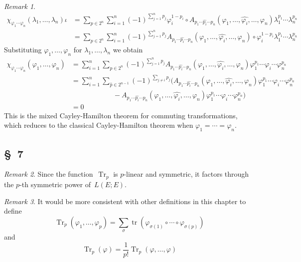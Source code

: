 \documentclass[letterpaper,12pt]{article}
\DeclareMathOperator{\tr}{tr}
\DeclareMathOperator{\Tr}{Tr}
\newcommand{\after}{\circ}
\newcommand{\delete}{\widehat}
\theoremstyle{definition}
\theoremstyle{remark}
\newtheorem*{rmk}{Remark}
\begin{document}
\begin{rmk}
\begin{align*}
\chi_{\varphi_1\cdots\varphi_n}(\lambda_1,\ldots,\lambda_n)\iota&=\sum_{p\in 2^n}\sum_{i=1}^n(-1)^{\sum_{j=1}^n p_j}\varphi_i^{1-p_i}\after A_{p_1\cdots\delete{p_i}\cdots p_n}(\varphi_1,\ldots,\delete{\varphi_i},\ldots,\varphi_n)\lambda_1^{p_1}\cdots\lambda_n^{p_n}\\
	&=\sum_{p\in 2^n}\sum_{i=1}^n(-1)^{\sum_{j=1}^n p_j}A_{p_1\cdots\delete{p_i}\cdots p_n}(\varphi_1,\ldots,\delete{\varphi_i},\ldots,\varphi_n)\after\varphi_i^{1-p_i}\lambda_1^{p_1}\cdots\lambda_n^{p_n}
\end{align*}
Substituting \(\varphi_1,\ldots,\varphi_n\) for \(\lambda_1,\ldots,\lambda_n\) we obtain
\begin{align*}
\chi_{\varphi_1\cdots\varphi_n}(\varphi_1,\ldots,\varphi_n)&=\sum_{i=1}^n\sum_{p\in 2^n}(-1)^{\sum_{j=1}^n p_j}A_{p_1\cdots\delete{p_i}\cdots p_n}(\varphi_1,\ldots,\delete{\varphi_i},\ldots,\varphi_n)\varphi_1^{p_1}\cdots\varphi_i\cdots\varphi_n^{p_n}\\
	&=\sum_{i=1}^n\sum_{\delete{p}\in 2^{n-1}}(-1)^{\sum_{j\ne i}p_j}\Biggl(A_{p_1\cdots\delete{p_i}\cdots p_n}(\varphi_1,\ldots,\delete{\varphi_i},\ldots,\varphi_n)\varphi_1^{p_1}\cdots\varphi_i\cdots\varphi_n^{p_n}\\
	&\qquad\qquad\qquad-A_{p_1\cdots\delete{p_i}\cdots p_n}(\varphi_1,\ldots,\delete{\varphi_i},\ldots,\varphi_n)\varphi_1^{p_1}\cdots\varphi_i\cdots\varphi_n^{p_n}\Biggr)\\
	&=0
\end{align*}
This is the mixed Cayley-Hamilton theorem for commuting transformations, which reduces to the classical Cayley-Hamilton theorem when \(\varphi_1=\cdots=\varphi_n\).
\end{rmk}

\subsection*{\S~7}
\begin{rmk}
Since the function~\(\Tr_p\) is \(p\)-linear and symmetric, it factors through the \(p\)-th symmetric power of~\(L(E;E)\).
\end{rmk}

\begin{rmk}
It would be more consistent with other definitions in this chapter to define
\[\Tr_p(\varphi_1,\ldots,\varphi_p)=\sum_{\sigma}\tr(\varphi_{\sigma(1)}\after\cdots\after\varphi_{\sigma(p)})\]
and
\[\Tr_p(\varphi)=\frac{1}{p!}\Tr_p(\varphi,\ldots,\varphi)\]
\end{rmk}
\end{document}
